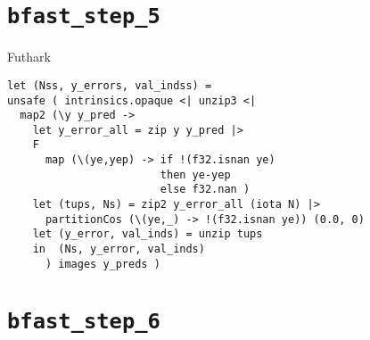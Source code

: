 \section{\texttt{bfast\_step\_5}} %


\begin{frame}[fragile]{Futhark}

%
\begin{verbatim}
let (Nss, y_errors, val_indss) =
unsafe ( intrinsics.opaque <| unzip3 <|
  map2 (\y y_pred ->
    let y_error_all = zip y y_pred |>
    F
      map (\(ye,yep) -> if !(f32.isnan ye) 
                        then ye-yep 
                        else f32.nan )
    let (tups, Ns) = zip2 y_error_all (iota N) |>
      partitionCos (\(ye,_) -> !(f32.isnan ye)) (0.0, 0)
    let (y_error, val_inds) = unzip tups
    in  (Ns, y_error, val_inds)
      ) images y_preds )
\end{verbatim}

\end{frame}

\section{\texttt{bfast\_step\_6}} 

